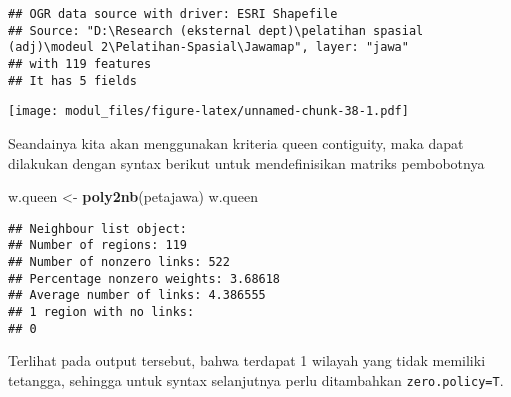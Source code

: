 \documentclass[
]{book}
\newenvironment{Shaded}{\begin{snugshade}}{\end{snugshade}}
\newcommand{\DataTypeTok}[1]{\textcolor[rgb]{0.13,0.29,0.53}{#1}}
\newcommand{\DecValTok}[1]{\textcolor[rgb]{0.00,0.00,0.81}{#1}}
\newcommand{\KeywordTok}[1]{\textcolor[rgb]{0.13,0.29,0.53}{\textbf{#1}}}
\newcommand{\NormalTok}[1]{#1}
\newcommand{\OperatorTok}[1]{\textcolor[rgb]{0.81,0.36,0.00}{\textbf{#1}}}
\newcommand{\StringTok}[1]{\textcolor[rgb]{0.31,0.60,0.02}{#1}}
\begin{document}
\begin{verbatim}
## OGR data source with driver: ESRI Shapefile 
## Source: "D:\Research (eksternal dept)\pelatihan spasial (adj)\modeul 2\Pelatihan-Spasial\Jawamap", layer: "jawa"
## with 119 features
## It has 5 fields
\end{verbatim}

\begin{Shaded}
\end{Shaded}

\texttt{[image: modul\_files/figure-latex/unnamed-chunk-38-1.pdf]}

Seandainya kita akan menggunakan kriteria queen contiguity, maka dapat dilakukan dengan syntax berikut untuk mendefinisikan matriks pembobotnya

\begin{Shaded}
\begin{Highlighting}[]
\NormalTok{w.queen \textless{}{-}}\StringTok{ }\KeywordTok{poly2nb}\NormalTok{(petajawa)}
\NormalTok{w.queen}
\end{Highlighting}
\end{Shaded}

\begin{verbatim}
## Neighbour list object:
## Number of regions: 119 
## Number of nonzero links: 522 
## Percentage nonzero weights: 3.68618 
## Average number of links: 4.386555 
## 1 region with no links:
## 0
\end{verbatim}

Terlihat pada output tersebut, bahwa terdapat 1 wilayah yang tidak memiliki tetangga, sehingga untuk syntax selanjutnya perlu ditambahkan \texttt{zero.policy=T}.
\end{document}
